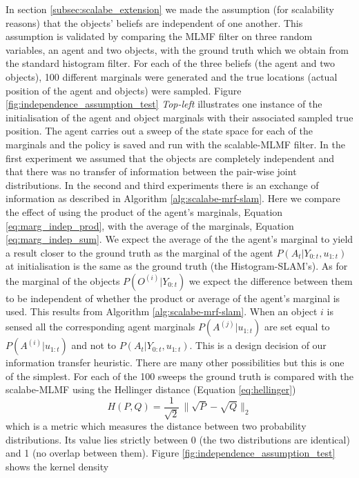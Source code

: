 In section \ref{subsec:scalabe_extension} we made the assumption (for scalability reasons) that the objects' beliefs are independent
of one another. This assumption is validated by comparing the MLMF filter on three random variables, an agent and two objects, with the ground truth
which we obtain from the standard histogram filter. For each of the three beliefs (the agent and two objects), 100 different marginals 
were generated and the true locations (actual position of the agent and objects) were sampled. 
Figure \ref{fig:independence_assumption_test} \textit{Top-left} illustrates one instance of the initialisation of the agent and object marginals
with their associated sampled true position.
The agent carries out  a sweep of the state space for each of the marginals and the policy is saved 
and run with the scalable-MLMF filter. In the first experiment we assumed that the objects are completely independent 
and that there was no transfer of information between the pair-wise joint distributions. In the second and third experiments there 
is an exchange of information as described in Algorithm \ref{alg:scalabe-mrf-slam}. Here we compare the effect of using 
the product of the agent's marginals, Equation \ref{eq:marg_indep_prod}, with the average of the marginals, Equation \ref{eq:marg_indep_sum}.
We expect the average of the the agent's marginal to yield a result closer to the ground truth as the marginal of the 
agent $P(A_t|Y_{0:t},u_{1:t})$ at initialisation is the same as the ground truth (the Histogram-SLAM's). As for the marginal of the 
objects $P(O^{(i)}|Y_{0:t})$ we expect the difference between them to be independent of whether the product or average of the 
agent's marginal is used. This results from Algorithm \ref{alg:scalabe-mrf-slam}. When an object $i$ is sensed all the corresponding 
agent marginals $P(A^{(j)}|u_{1:t})$ are set equal to $P(A^{(i)}|u_{1:t})$ and not to $P(A_t|Y_{0:t},u_{1:t})$. This is a design 
decision of our information transfer heuristic. There are many other possibilities but this is one of the simplest.
For each of the 100 sweeps the ground truth is compared with the scalabe-MLMF using the Hellinger distance (Equation \ref{eq:hellinger})
\begin{equation} \label{eq:hellinger}
 H(P,Q) = \frac{1}{\sqrt{2}}\, \|\sqrt{P} - \sqrt{Q}\|_2  
\end{equation}
which is a metric which measures the distance between two probability distributions. Its value lies strictly between 0 (the two 
distributions are identical) and 1 (no overlap between them). Figure \ref{fig:independence_assumption_test} shows the kernel density 
